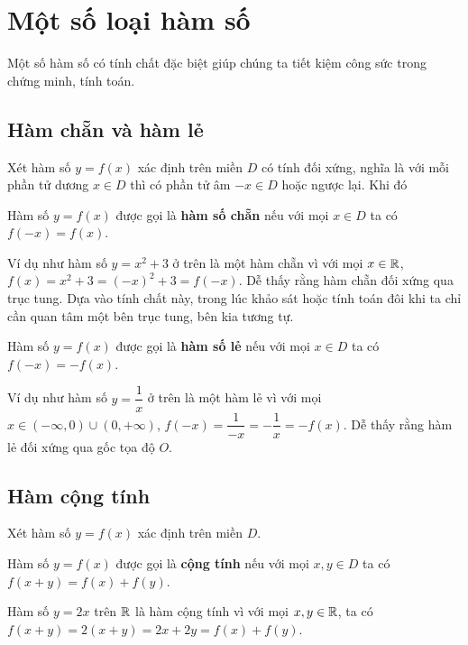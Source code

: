 \section{Một số loại hàm số}

Một số hàm số có tính chất đặc biệt giúp chúng ta tiết kiệm công sức trong chứng minh, tính toán.

\subsection*{Hàm chẵn và hàm lẻ}

Xét hàm số $y=f(x)$ xác định trên miền $D$ có tính đối xứng, nghĩa là với mỗi phần tử dương $x \in D$ thì có phần tử âm $-x \in D$ hoặc ngược lại. Khi đó

\begin{definition}
    Hàm số $y=f(x)$ được gọi là \textbf{hàm số chẵn} nếu với mọi $x \in D$ ta có $f(-x) = f(x)$.
\end{definition}

Ví dụ như hàm số $y = x^2 + 3$ ở trên là một hàm chẵn vì với mọi $x \in \mathbb{R}$, $f(x) = x^2 + 3 = (-x)^2 + 3 = f(-x)$. Dễ thấy rằng hàm chẵn đối xứng qua trục tung. Dựa vào tính chất này, trong lúc khảo sát hoặc tính toán đôi khi ta chỉ cần quan tâm một bên trục tung, bên kia tương tự.

\begin{definition}[Hàm số lẻ]
    Hàm số $y=f(x)$ được gọi là \textbf{hàm số lẻ} nếu với mọi $x \in D$ ta có $f(-x) = -f(x)$.
\end{definition}

Ví dụ như hàm số $y = \dfrac{1}{x}$ ở trên là một hàm lẻ vì với mọi $x \in (-\infty, 0) \cup (0, +\infty)$, $f(-x) = \dfrac{1}{-x} = -\dfrac{1}{x} = -f(x)$. Dễ thấy rằng hàm lẻ đối xứng qua gốc tọa độ $O$.

\subsection*{Hàm cộng tính}

Xét hàm số $y=f(x)$ xác định trên miền $D$. 

\begin{definition}
    Hàm số $y = f(x)$ được gọi là \textbf{cộng tính} nếu với mọi $x, y \in D$ ta có $f(x+y) = f(x) + f(y)$.
\end{definition}

\begin{example}
    Hàm số $y = 2x$ trên $\mathbb{R}$ là hàm cộng tính vì với mọi $x, y \in \mathbb{R}$, ta có $f(x+y) = 2(x+y) = 2x + 2y = f(x) + f(y)$.
\end{example}

